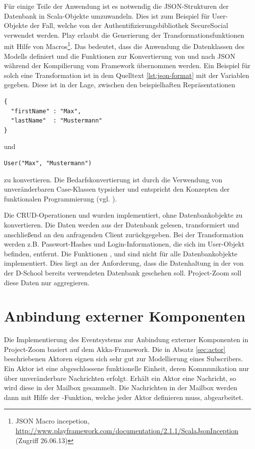Für einige Teile der Anwendung ist es notwendig die JSON-Strukturen der Datenbank in Scala-Objekte umzuwandeln. Dies ist zum Beispiel für User-Objekte der Fall, welche von der Authentifizierungsbibliothek SecureSocial verwendet werden. Play erlaubt die Generierung der Transformationsfunktionen mit Hilfe von Macros\footnote{JSON Macro incepetion, \url{http://www.playframework.com/documentation/2.1.1/ScalaJsonInception} (Zugriff 26.06.13)}. Das bedeutet, dass die Anwendung die Datenklassen des Modells definiert und die Funktionen zur Konvertierung von und nach JSON während der Kompilierung vom Framework übernommen werden. Ein Beispiel für solch eine Transformation ist in dem Quelltext \ref{lst:json-format} mit der Variablen  gegeben. Diese ist in der Lage, zwischen den beispielhaften Repräsentationen 
\begin{lstlisting} 
{ 
  "firstName" : "Max", 
  "lastName"  : "Mustermann" 
}
\end{lstlisting} und 
\begin{lstlisting} 
User("Max", "Mustermann")
\end{lstlisting} 
zu konvertieren. Die Bedarfskonvertierung ist durch die Verwendung von unveränderbaren Case-Klassen typsicher und entspricht den Konzepten der funktionalen Programmierung (vgl. \cite{functional-thinking}).

Die CRUD-Operationen  und  wurden implementiert, ohne Datenbankobjekte zu konvertieren. Die Daten werden aus der Datenbank gelesen, transformiert und anschließend an den anfragenden Client zurückgegeben. Bei der Transformation werden z.B. Passwort-Hashes und Login-Informationen, die sich im User-Objekt befinden, entfernt. Die Funktionen ,  und  sind nicht für alle Datenbankobjekte implementiert. Dies liegt an der Anforderung, dass die Datenhaltung in der von der D-School bereits verwendeten Datenbank geschehen soll. Project-Zoom soll diese Daten nur aggregieren.


\section{Anbindung externer Komponenten}

Die Implementierung des Eventsystems zur Anbindung externer Komponenten in Project-Zoom basiert auf dem Akka-Framework. Die in Absatz \ref{sec:actor} beschriebenen Aktoren eignen sich sehr gut zur Modellierung eines Subscribers. Ein Aktor ist eine abgeschlossene funktionelle Einheit, deren Kommunikation nur über unveränderbare Nachrichten erfolgt. Erhält ein Aktor eine Nachricht, so wird diese in der Mailbox gesammelt. Die Nachrichten in der Mailbox werden dann mit Hilfe der -Funktion, welche jeder Aktor definieren muss, abgearbeitet. 

